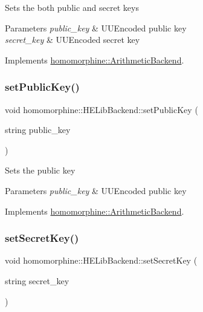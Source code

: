 Sets the both public and secret keys


\begin{DoxyParams}{Parameters}
{\em public\+\_\+key} & U\+U\+Encoded public key \\
\hline
{\em secret\+\_\+key} & U\+U\+Encoded secret key \\
\hline
\end{DoxyParams}


Implements \hyperlink{classhomomorphine_1_1_arithmetic_backend_ac78f4b42dce3dce23edd81dba60b16c8}{homomorphine\+::\+Arithmetic\+Backend}.

\mbox{\label{classhomomorphine_1_1_h_e_lib_backend_af54dc3990d99aab69c97172d0e5b4e51}} 
\subsubsection{\texorpdfstring{set\+Public\+Key()}{setPublicKey()}}
{\footnotesize\ttfamily void homomorphine\+::\+H\+E\+Lib\+Backend\+::set\+Public\+Key (\begin{DoxyParamCaption}\item[{string}]{public\+\_\+key }\end{DoxyParamCaption})\hspace{0.3cm}{\ttfamily [virtual]}}

Sets the public key


\begin{DoxyParams}{Parameters}
{\em public\+\_\+key} & U\+U\+Encoded public key \\
\hline
\end{DoxyParams}


Implements \hyperlink{classhomomorphine_1_1_arithmetic_backend_af2dd2c37ed1fcd56b58baa6cb3f14e8b}{homomorphine\+::\+Arithmetic\+Backend}.

\mbox{\label{classhomomorphine_1_1_h_e_lib_backend_a483a6695be2d733d48e2180ffb25d053}} 
\subsubsection{\texorpdfstring{set\+Secret\+Key()}{setSecretKey()}}
{\footnotesize\ttfamily void homomorphine\+::\+H\+E\+Lib\+Backend\+::set\+Secret\+Key (\begin{DoxyParamCaption}\item[{string}]{secret\+\_\+key }\end{DoxyParamCaption})\hspace{0.3cm}{\ttfamily [virtual]}}

